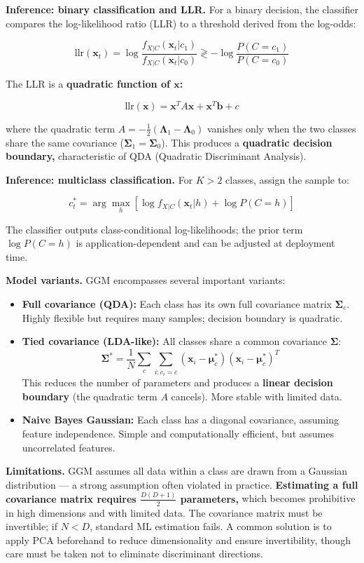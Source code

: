 \textbf{Inference: binary classification and LLR.} For a binary decision, the classifier compares the log-likelihood ratio (LLR) to a threshold derived from the log-odds:

$$\text{llr}(\mathbf{x}_t) = \log\frac{f_{X|C}(\mathbf{x}_t|c_1)}{f_{X|C}(\mathbf{x}_t|c_0)} \gtrless -\log\frac{P(C=c_1)}{P(C=c_0)}$$

The LLR is a \textbf{quadratic function of $\mathbf{x}$:}

$$\text{llr}(\mathbf{x}) = \mathbf{x}^T A \mathbf{x} + \mathbf{x}^T \mathbf{b} + c$$

where the quadratic term $A = -\frac{1}{2}(\boldsymbol{\Lambda}_1 - \boldsymbol{\Lambda}_0)$ vanishes only when the two classes share the same covariance ($\boldsymbol{\Sigma}_1 = \boldsymbol{\Sigma}_0$). This produces a \textbf{quadratic decision boundary,} characteristic of QDA (Quadratic Discriminant Analysis).

\textbf{Inference: multiclass classification.} For $K > 2$ classes, assign the sample to:

$$c_t^* = \arg\max_h \left[\log f_{X|C}(\mathbf{x}_t|h) + \log P(C=h)\right]$$

The classifier outputs class-conditional log-likelihoods; the prior term $\log P(C=h)$ is application-dependent and can be adjusted at deployment time.

\textbf{Model variants.} GGM encompasses several important variants:

\begin{itemize}
\item \textbf{Full covariance (QDA):} Each class has its own full covariance matrix $\boldsymbol{\Sigma}_c$. Highly flexible but requires many samples; decision boundary is quadratic.
\item \textbf{Tied covariance (LDA-like):} All classes share a common covariance $\boldsymbol{\Sigma}$:
$$\boldsymbol{\Sigma}^* = \frac{1}{N}\sum_c \sum_{i: c_i = c}(\mathbf{x}_i - \boldsymbol{\mu}_c^*)(\mathbf{x}_i - \boldsymbol{\mu}_c^*)^T$$
This reduces the number of parameters and produces a \textbf{linear decision boundary} (the quadratic term $A$ cancels). More stable with limited data.
\item \textbf{Naive Bayes Gaussian:} Each class has a diagonal covariance, assuming feature independence. Simple and computationally efficient, but assumes uncorrelated features.
\end{itemize}

\textbf{Limitations.} GGM assumes all data within a class are drawn from a Gaussian distribution — a strong assumption often violated in practice. \textbf{Estimating a full covariance matrix requires $\frac{D(D+1)}{2}$ parameters,} which becomes prohibitive in high dimensions and with limited data. The covariance matrix must be invertible; if $N < D$, standard ML estimation fails. A common solution is to apply PCA beforehand to reduce dimensionality and ensure invertibility, though care must be taken not to eliminate discriminant directions.
